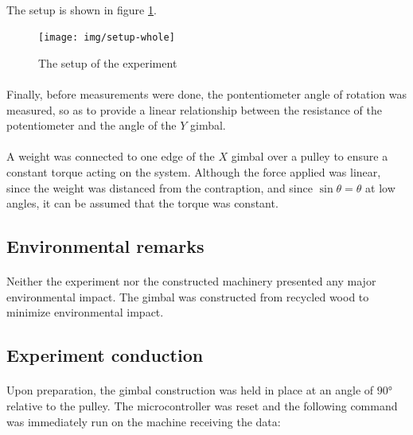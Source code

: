 \documentclass[a4paper]{article}
\begin{document}
\paragraph*{}
The setup is shown in figure \ref{fig:setup-whole}.

\begin{figure}[ht]
  \centering
  \texttt{[image: img/setup-whole]}
  \caption{The setup of the experiment}
  \label{fig:setup-whole}
\end{figure}

\paragraph*{}
Finally, before measurements were done, the pontentiometer angle of rotation
was measured, so as to provide a linear relationship between the resistance of
the potentiometer and the angle of the $Y$ gimbal.

\paragraph*{}
A weight was connected to one edge of the $X$ gimbal over a pulley to ensure a
constant torque acting on the system. Although the force applied was linear,
since the weight was distanced from the contraption, and since $\sin \theta =
\theta$ at low angles, it can be assumed that the torque was constant.

\subsection{Environmental remarks}

\paragraph*{}
Neither the experiment nor the constructed machinery presented any major
environmental impact. The gimbal was constructed from recycled wood to minimize
environmental impact.

\subsection{Experiment conduction}

\paragraph*{}
Upon preparation, the gimbal construction was held in place at an angle of $90
\si{\degree}$ relative to the pulley. The microcontroller was reset and the
following command was immediately run on the machine receiving the data:
\end{document}
